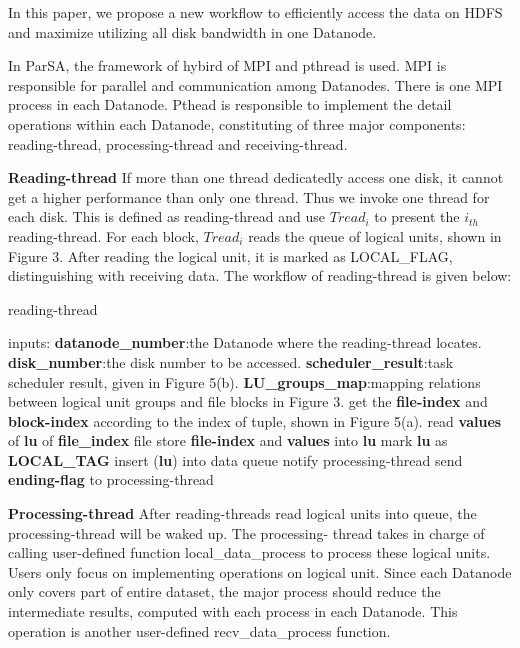 \documentclass[preprint,12pt]{elsarticle}
\begin{document}
In this paper, we propose a new workflow to efficiently access the data on HDFS and maximize utilizing all disk bandwidth in one 
Datanode. \par
In ParSA, the framework of hybird of MPI and pthread is used. MPI is responsible for parallel and communication among Datanodes. There
is one MPI process in each Datanode. Pthead is responsible to implement the detail operations within each Datanode, constituting of 
three major components: reading-thread, processing-thread and receiving-thread. \par
\textbf{Reading-thread} If more than one thread dedicatedly access one disk, it cannot get a higher performance than only one thread. 
Thus we invoke one thread for each disk. This is defined as reading-thread and use $Tread_i$ to present the $i_{th}$ reading-thread. 
For each block, $Tread_i$ reads the queue of logical units, shown in Figure 3. After reading the logical unit, it is marked as LOCAL\_FLAG, 
distinguishing with receiving data. The workflow of reading-thread is given below:

\begin{algorithm}[htb]
\caption{reading-thread} 
\label{alg:reading-thread}
\begin{algorithmic}
\STATE inputs:
\STATE \textbf{datanode\_number}:the Datanode where the reading-thread locates.
\STATE \textbf{disk\_number}:the disk number to be accessed. 
\STATE \textbf{scheduler\_result}:task scheduler result, given in Figure 5(b).
\STATE \textbf{LU\_groups\_map}:mapping relations between logical unit groups and file blocks in Figure 3.
\newline
{} 
\STATE get the \textbf{file-index} and \textbf{block-index} according to the index of tuple, shown in Figure 5(a).
\STATE read \textbf{values} of \textbf{lu} of \textbf{file\_index} file
\STATE store \textbf{file-index} and \textbf{values} into \textbf{lu}
\STATE mark \textbf{lu} as \textbf{LOCAL\_TAG}
\STATE insert (\textbf{lu}) into data queue
\STATE notify processing-thread
\ENDFOR
\ENDIF
\ENDFOR
\STATE send \textbf{ending-flag} to processing-thread
\end{algorithmic}
\end{algorithm}

\textbf{Processing-thread} After reading-threads read logical units into queue, the processing-thread will be waked up. The processing-
thread takes in charge of calling user-defined function local\_data\_process to process these logical units. Users only focus on 
implementing operations on logical unit. Since each Datanode only covers part of entire dataset, the major process should reduce the 
intermediate results, computed with each process in each Datanode. This operation is another user-defined recv\_data\_process function. 
\end{document}
